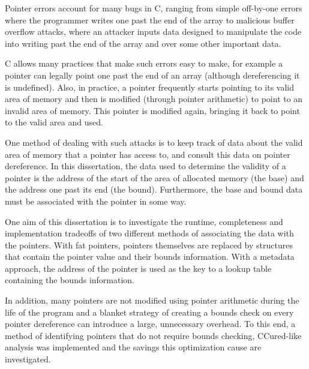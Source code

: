\documentclass[a4paper,12pt,twoside,openright]{report}
\begin{document}
Pointer errors account for many bugs in C, ranging from simple off-by-one errors where the programmer writes one past the end of the array to malicious buffer overflow attacks, where an attacker inputs data designed to manipulate the code into writing past the end of the array and over some other important data.

C allows many practices that make such errors easy to make, for example a pointer can legally point one past the end of an array (although dereferencing it is undefined).
Also, in practice, a pointer frequently starts pointing to its valid area of memory and then is modified (through pointer arithmetic) to point to an invalid area of memory.
This pointer is modified again, bringing it back to point to the valid area and used.

One method of dealing with such attacks is to keep track of data about the valid area of memory that a pointer has access to, and consult this data on pointer dereference.
In this dissertation, the data used to determine the validity of a pointer is the address of the start of the area of allocated memory (the base) and the address one past its end (the bound).
Furthermore, the base and bound data must be associated with the pointer in some way.

One aim of this dissertation is to investigate the runtime, completeness and implementation tradeoffs of two different methods of associating the data with the pointers.
With fat pointers, pointers themselves are replaced by structures that contain the pointer value and their bounds information.
With a metadata approach, the address of the pointer is used as the key to a lookup table containing the bounds information.

In addition, many pointers are not modified using pointer arithmetic during the life of the program and a blanket strategy of creating a bounds check on every pointer dereference can introduce a large, unnecessary overhead.
To this end, a method of identifying pointers that do not require bounds checking, CCured-like analysis was implemented and the savings this optimization cause are investigated.
\end{document}
